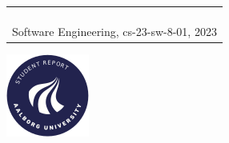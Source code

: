 \begin{titlepage}
{{\begin{tabular}{@{}p{\textwidth}@{}}
\begin{center}
{      }
    \end{center}
    \vspace{0.1cm}
   \begin{center}
    {\Large
      Christian Bager Bach Houmann, Daniel Overvad Nykjær, Ivik Lau Dalgas Hostrup, Marco Klaustrup Justesen, Patrick Frostholm Østergaard, Rasmus Høyer Hansen %
    }\\
    \vspace{0.2cm}
    {\large
      Software Engineering, cs-23-sw-8-01, 2023%
    }
   \end{center}
   \vspace{0.2cm}
   \begin{center}
    {\Large
      8th semester
    }
   \end{center}
  \end{tabular}}}
  \vfill
  \begin{center}
    \includegraphics[width=0.2\paperwidth]{AAUgraphics/aau_logo_circle_en}%
  \end{center}
\end{titlepage}
\clearpage
